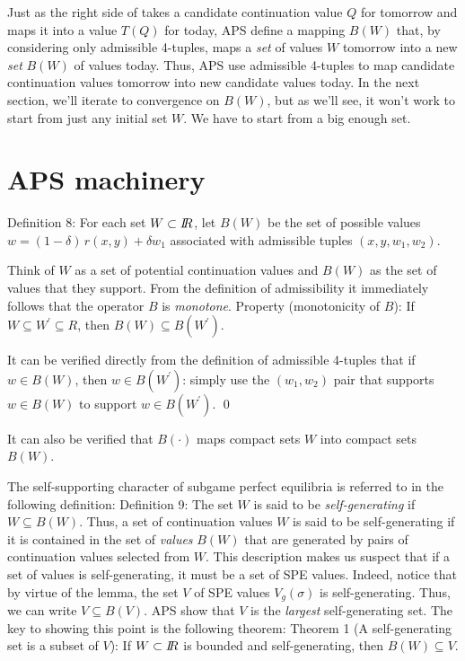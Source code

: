   Just as the right  side of  takes a candidate continuation value
 $Q$ for tomorrow
and maps it  into a value $T(Q)$ for today, APS define a mapping
$B(W)$ that, by considering only admissible 4-tuples,  maps a
{\it set\/} of values $W$ tomorrow into a new {\it set\/} $B(W)$ of
values today.
Thus, APS use
admissible 4-tuples to map candidate continuation values tomorrow  into
new candidate values today.
In the next section, we'll iterate to convergence on $B(W)$,
 but as we'll see,
it won't work to start from just any initial set $W$. We have to start
from a big enough set.

\section{APS machinery}

\medskip\noindent
{\sc Definition 8:}  For each set $W\subset {I\kern-0.3em R}$, let $B(W)$ be the set of
possible values $w=(1-\delta)\, r(x,y) + \delta w_1$ associated with
admissible tuples $(x,y,w_1,w_2)$.

\medskip
 Think of
$W$ as a set of potential continuation values and $B(W)$ as the
set of values that they support. From the
definition of admissibility it immediately follows that the operator $B$ is
{\it monotone}.
\medskip\noindent
{\sc Property} (monotonicity of $B$):  If $W\subseteq W^\prime \subseteq R$,
then $B(W) \subseteq B(W^\prime)$.

\medskip
{}
It can be verified directly from the definition of admissible 4-tuples that
if $w\in B(W)$, then $w \in B(W^\prime)$:  simply use the $(w_1,w_2)$
pair that supports $w\in B(W)$ to support $w\in B(W^\prime)$.
\qed

\medskip
It can also be verified that $B(\cdot)$ maps compact sets $W$ into compact
sets $B(W)$.

The self-supporting character of subgame perfect equilibria is referred to in
the following definition:
\medskip\noindent
{\sc Definition 9:}  The set $W$ is said to be {\it self-generating\/} if
$W\subseteq B(W)$.  
\medskip
Thus, a set of continuation values  $W$ is said to be self-generating if it is contained
in the set of {\it values\/} $B(W)$
that are generated by pairs of continuation values selected from $W$. This description makes us suspect that if a set of
values is self-generating, it must be a set of SPE
values.    Indeed, notice that
by virtue of the lemma, the set $V$ of SPE values $V_g (\sigma)$ is
self-generating. Thus, we can write
$V\subseteq B(V)$.  APS
show that $V$ is the {\it largest\/} self-generating set.  The key to showing
this point is the following theorem:
\medskip\noindent
{\sc Theorem 1} (A self-generating set is a subset of $V$): If $W\subset {I\kern-0.3em R}$ is bounded and
self-generating, then $B(W)\subseteq V$.

